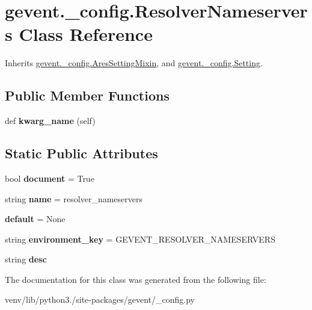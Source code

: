 \hypertarget{classgevent_1_1__config_1_1_resolver_nameservers}{}\section{gevent.\+\_\+config.\+Resolver\+Nameservers Class Reference}
\label{classgevent_1_1__config_1_1_resolver_nameservers}


Inherits \hyperlink{classgevent_1_1__config_1_1_ares_setting_mixin}{gevent.\+\_\+config.\+Ares\+Setting\+Mixin}, and \hyperlink{classgevent_1_1__config_1_1_setting}{gevent.\+\_\+config.\+Setting}.

\subsection*{Public Member Functions}
\begin{DoxyCompactItemize}
\item 
\mbox{\label{classgevent_1_1__config_1_1_resolver_nameservers_a448147418c1431d4448eefaf990f977d}} 
def {\bfseries kwarg\+\_\+name} (self)
\end{DoxyCompactItemize}
\subsection*{Static Public Attributes}
\begin{DoxyCompactItemize}
\item 
\mbox{\label{classgevent_1_1__config_1_1_resolver_nameservers_a4d0a2f9169b7ae11f0d7fbd27a7f3bad}} 
bool {\bfseries document} = True
\item 
\mbox{\label{classgevent_1_1__config_1_1_resolver_nameservers_ad91c2956811af916ba3daeebcf275f9a}} 
string {\bfseries name} = \textquotesingle{}resolver\+\_\+nameservers\textquotesingle{}
\item 
\mbox{\label{classgevent_1_1__config_1_1_resolver_nameservers_a52d42cf14545c495dca5daaacab1bafc}} 
{\bfseries default} = None
\item 
\mbox{\label{classgevent_1_1__config_1_1_resolver_nameservers_a20333c95ff3386095c1c062110dc5edf}} 
string {\bfseries environment\+\_\+key} = \textquotesingle{}G\+E\+V\+E\+N\+T\+\_\+\+R\+E\+S\+O\+L\+V\+E\+R\+\_\+\+N\+A\+M\+E\+S\+E\+R\+V\+E\+RS\textquotesingle{}
\item 
\mbox{\label{classgevent_1_1__config_1_1_resolver_nameservers_aad78119a77adc2271d90acae96c3ffd2}} 
string {\bfseries desc}
\end{DoxyCompactItemize}


The documentation for this class was generated from the following file\+:\begin{DoxyCompactItemize}
\item 
venv/lib/python3./site-\/packages/gevent/\+\_\+config.\+py\end{DoxyCompactItemize}
